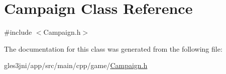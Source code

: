\hypertarget{class_campaign}{}\section{Campaign Class Reference}
\label{class_campaign}


{\ttfamily \#include $<$Campaign.\+h$>$}



The documentation for this class was generated from the following file\+:\begin{DoxyCompactItemize}
\item 
gles3jni/app/src/main/cpp/game/\hyperlink{_campaign_8h}{Campaign.\+h}\end{DoxyCompactItemize}
